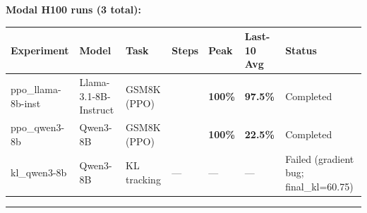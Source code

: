 \documentclass[
  american,
  11pt,
  a4paper,
  oneside]{report}
\newcounter{none} %
\begin{document}
\textbf{Modal H100 runs (3 total):}

{\def\LTcaptype{none} %
\begin{longtable}[]{@{}
  >{\raggedright\arraybackslash}p{}
  >{\raggedright\arraybackslash}p{}
  >{\raggedright\arraybackslash}p{}
  >{\raggedright\arraybackslash}p{}
  >{\raggedright\arraybackslash}p{}
  >{\raggedright\arraybackslash}p{}
  >{\raggedright\arraybackslash}p{}@{}}
\toprule\noalign{}
\begin{minipage}[b]{\linewidth}\raggedright
Experiment
\end{minipage} & \begin{minipage}[b]{\linewidth}\raggedright
Model
\end{minipage} & \begin{minipage}[b]{\linewidth}\raggedright
Task
\end{minipage} & \begin{minipage}[b]{\linewidth}\raggedright
Steps
\end{minipage} & \begin{minipage}[b]{\linewidth}\raggedright
Peak
\end{minipage} & \begin{minipage}[b]{\linewidth}\raggedright
Last-10 Avg
\end{minipage} & \begin{minipage}[b]{\linewidth}\raggedright
Status
\end{minipage} \\
\midrule\noalign{}
\endhead
\bottomrule\noalign{}
\endlastfoot
ppo\_llama-8b-inst & Llama-3.1-8B-Instruct & GSM8K (PPO) & 30 &
\textbf{100\%} & \textbf{97.5\%} & Completed \\
ppo\_qwen3-8b & Qwen3-8B & GSM8K (PPO) & 30 & \textbf{100\%} &
\textbf{22.5\%} & Completed \\
kl\_qwen3-8b & Qwen3-8B & KL tracking & --- & --- & --- & Failed
(gradient bug; final\_kl=60.75) \\
\end{longtable}
}

\begin{center}\rule{0.5\linewidth}{0.5pt}\end{center}
\end{document}
